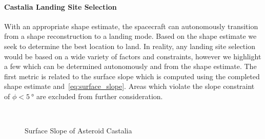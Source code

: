 \paragraph{Castalia Landing Site Selection}
With an appropriate shape estimate, the spacecraft can autonomously transition from a shape reconstruction to a landing mode.
Based on the shape estimate we seek to determine the best location to land. 
In reality, any landing site selection would be based on a wide variety of factors and constraints, however we highlight a few which can be determined autonomously and from the shape estimate.
The first metric is related to the surface slope which is computed using the completed shape estimate and~\cref{eq:surface_slope}.
Areas which violate the slope constraint of \( \phi < \SI{5}{\degree} \) are excluded from further consideration.
\begin{figure}[htbp]
    \centering
    ~
    \caption{Surface Slope of Asteroid Castalia\label{fig:surface_slope_castalia_both}}
\end{figure}

